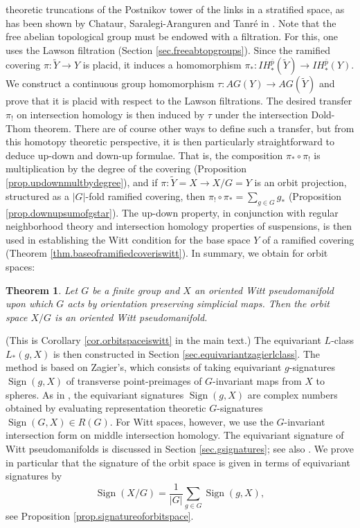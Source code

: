 \documentclass{amsart}
\newtheorem*{thm*}{Theorem}
\theoremstyle{definition}
\theoremstyle{remark}
\newcommand {\bp}    {{\ensuremath{\bar{p}}}}
\newcommand {\wY}    {{\ensuremath{\widetilde{Y}}}}
\newcommand {\Sign}    {{\ensuremath{\operatorname{Sign}}}}
\begin{document}
theoretic truncations of the Postnikov tower of the links in a stratified space,
as has been shown by Chataur, Saralegi-Aranguren and Tanr\'e 
in \cite{chataursttruncations}.
Note that the free abelian topological group must be endowed with a filtration.
For this, one uses the Lawson filtration (Section \ref{sec.freeabtopgroups}).
Since the ramified covering $\pi: \wY \to Y$ is placid, it induces a
homomorphism $\pi_*: IH^\bp_* (\wY) \to IH^\bp_* (Y)$.
We construct a continuous group homomorphism
$\tau: AG(Y) \to AG(\wY)$ and prove that it is placid with respect to the
Lawson filtrations.
The desired transfer $\pi_!$ on intersection homology is then induced by
$\tau$ under the intersection Dold-Thom theorem.
There are of course other ways to define such a transfer, but
from this homotopy theoretic perspective, it is then particularly straightforward
to deduce up-down and down-up formulae.
That is, the composition $\pi_* \circ \pi_!$ is multiplication by the degree of
the covering (Proposition \ref{prop.updownmultbydegree}), 
and if $\pi: \wY=X \to X/G=Y$ is
an orbit projection, structured as a $|G|$-fold ramified covering, then
$\pi_! \circ \pi_* = \sum_{g\in G} g_*$ (Proposition \ref{prop.downupsumofgstar}).
The up-down property, in conjunction with regular neighborhood theory
and intersection homology properties of suspensions,
is then used in establishing the Witt condition for 
the base space $Y$ of a ramified covering 
(Theorem \ref{thm.baseoframifiedcoveriswitt}).
In summary, we obtain for orbit spaces:

\begin{thm*} 
Let $G$ be a finite group and $X$ an oriented Witt pseudomanifold
upon which $G$ acts by orientation preserving simplicial maps.
Then the orbit space $X/G$ is an oriented Witt pseudomanifold.
\end{thm*}

(This is Corollary \ref{cor.orbitspaceiswitt} in the main text.)
The equivariant $L$-class $L_* (g,X)$ is then constructed in
Section \ref{sec.equivariantzagierlclass}.
The method is based on Zagier's, which consists of
taking equivariant $g$-signatures $\Sign (g,X)$ of
transverse point-preimages of $G$-invariant maps from $X$
to spheres. As in \cite{atiyahsinger},
the equivariant signatures $\Sign (g,X)$
are complex numbers obtained by evaluating representation theoretic
$G$-signatures $\Sign (G,X) \in R(G)$.
For Witt spaces, however, we use the $G$-invariant intersection
form on middle intersection homology. The equivariant signature
of Witt pseudomanifolds is discussed in Section \ref{sec.gsignatures}; 
see also \cite[Section 5]{blp}.
We prove in particular that the signature of the orbit space is given in terms 
of equivariant signatures by
\[ \Sign (X/G) = \frac{1}{|G|} \sum_{g\in G} \Sign (g,X), \]
see Proposition \ref{prop.signatureoforbitspace}.
\end{document}
